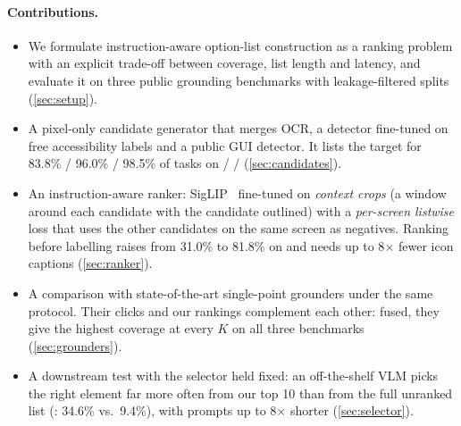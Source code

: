 \paragraph{Contributions.}
\begin{itemize}
\item We formulate instruction-aware option-list construction as a ranking problem with an explicit trade-off
between coverage, list length and latency, and evaluate it on three public grounding benchmarks with
leakage-filtered splits (\cref{sec:setup}).
\item A pixel-only candidate generator that merges OCR, a detector fine-tuned on free accessibility labels and a
public GUI detector. It lists the target for 83.8\% / 96.0\% / 98.5\% of tasks on \osw / \sspro / \ssv
(\cref{sec:candidates}).
\item An instruction-aware ranker: SigLIP~\cite{zhai2023siglip} fine-tuned on \emph{context crops} (a window
around each candidate with the candidate outlined) with a \emph{per-screen listwise} loss that uses the other
candidates on the same screen as negatives. Ranking before labelling raises  from 31.0\% to 81.8\% on
\sspro and needs up to 8$\times$ fewer icon captions (\cref{sec:ranker}).
\item A comparison with state-of-the-art single-point grounders under the same protocol. Their clicks and our
rankings complement each other: fused, they give the highest coverage at every $K$ on all three benchmarks
(\cref{sec:grounders}).
\item A downstream test with the selector held fixed: an off-the-shelf VLM picks the right element far more often
from our top 10 than from the full unranked list (\sspro: 34.6\% vs.\ 9.4\%), with prompts up to 8$\times$
shorter (\cref{sec:selector}).
\end{itemize}

